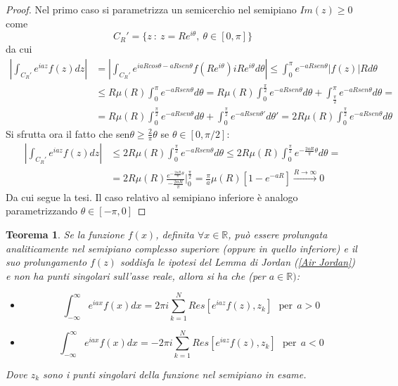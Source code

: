 \documentclass[twoside]{article}
\newtheorem{theorem}{Teorema}[section]
\begin{document}
\begin{proof}
Nel primo caso si parametrizza un semicerchio nel semipiano $Im(z)\ge0$ come 
\begin{equation}
    C_R'=\{ z \ : \ z=Re^{i\theta}, \ \theta \in [0,\pi] \}
\end{equation}
da cui
\begin{align}
    \left| \int_{C_R'}e^{iaz}f(z) dz \right|&=\left| \int_{C_R'}e^{iaRcos\theta-aRsen\theta}f(Re^{i\theta}) iRe^{i\theta}d\theta \right|\le \int_0^\pi e^{-aRsen\theta}|f(z)|Rd\theta\\
    &\le R\mu(R)\int_0^\pi e^{-aRsen\theta}d\theta=R\mu(R)\int_0^\frac{\pi}{2}
    e^{-aRsen\theta}d\theta+\int_{\frac{\pi}{2}}^\pi e^{-aRsen\theta}d\theta=\\
    &= R\mu(R)\int_0^\frac{\pi}{2}e^{-aRsen\theta}d\theta+\int_0^{\frac{\pi}{2}} e^{-aRsen\theta'}d\theta'=2R\mu(R)\int_0^\frac{\pi}{2}e^{-aRsen\theta}d\theta
\end{align}
Si sfrutta ora il fatto che sen$\theta\ge\frac{2}{\pi}\theta$ se $\theta\in[0,\pi/2]$:
\begin{align}
    \left| \int_{C_R'}e^{iaz}f(z) dz \right|&\le2R\mu(R)\int_0^\frac{\pi}{2}e^{-aRsen\theta}d\theta\le2R\mu(R)\int_0^\frac{\pi}{2}e^{-\frac{2aR}{\pi}\theta}d\theta=\\
    &=2 R\mu(R)\frac{e^{-\frac{2aR}{\pi}\theta}}{-\frac{2aR}{\pi}}\biggl|_0^\frac{\pi}{2}=\frac{\pi}{a}\mu(R)[1-e^{-aR}]\xrightarrow{R\to\infty}0
\end{align}
Da cui segue la tesi. Il caso relativo al semipiano inferiore è analogo parametrizzando $\theta\in[-\pi,0]$
\end{proof}

\begin{theorem}
Se la funzione $f(x)$, definita $\forall x \in \mathds{R}$, può essere prolungata analiticamente nel semipiano complesso superiore (oppure in quello inferiore) e il suo prolungamento $f(z)$ soddisfa le ipotesi del Lemma di Jordan (\ref{Air Jordan}) e non ha punti singolari sull'asse reale, allora si ha che (per $a \in \mathds{R})$:
\begin{itemize}
    \item \begin{equation}
        \int_{-\infty}^{\infty}e^{iax}f(x)dx=2\pi i \sum_{k=1}^N Res[e^{iaz}f(z),z_k] \ \ \ \text{per} \ \ a>0
    \end{equation}
    \item \begin{equation}
        \int_{-\infty}^{\infty}e^{iax}f(x)dx=-2\pi i \sum_{k=1}^N Res[e^{iaz}f(z),z_k] \ \ \ \text{per} \ \ a<0
    \end{equation}
\end{itemize}
Dove $z_k$ sono i punti singolari della funzione nel semipiano in esame.
\end{theorem}
\end{document}
